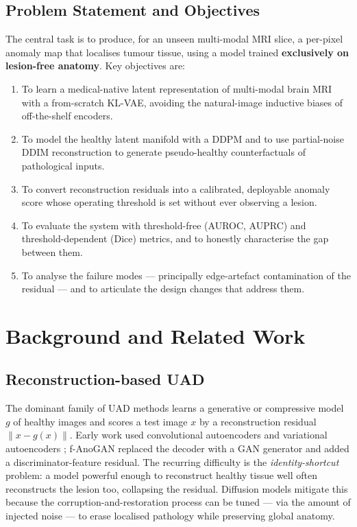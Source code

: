 \documentclass[12pt, a4paper]{article}
\begin{document}
\subsection{Problem Statement and Objectives}
The central task is to produce, for an unseen multi-modal MRI slice, a per-pixel anomaly map that localises tumour tissue, using a model trained \textbf{exclusively on lesion-free anatomy}. Key objectives are:
\begin{enumerate}[label=\alph*)]
    \item To learn a medical-native latent representation of multi-modal brain MRI with a from-scratch KL-VAE, avoiding the natural-image inductive biases of off-the-shelf encoders.
    \item To model the healthy latent manifold with a DDPM and to use partial-noise DDIM reconstruction to generate pseudo-healthy counterfactuals of pathological inputs.
    \item To convert reconstruction residuals into a calibrated, deployable anomaly score whose operating threshold is set without ever observing a lesion.
    \item To evaluate the system with threshold-free (AUROC, AUPRC) and threshold-dependent (Dice) metrics, and to honestly characterise the gap between them.
    \item To analyse the failure modes — principally edge-artefact contamination of the residual — and to articulate the design changes that address them.
\end{enumerate}

\section{Background and Related Work}
\subsection{Reconstruction-based UAD}
The dominant family of UAD methods learns a generative or compressive model $g$ of healthy images and scores a test image $x$ by a reconstruction residual $\|x - g(x)\|$. Early work used convolutional autoencoders and variational autoencoders \cite{baur2021}; f-AnoGAN \cite{schlegl2019} replaced the decoder with a GAN generator and added a discriminator-feature residual. The recurring difficulty is the \emph{identity-shortcut} problem: a model powerful enough to reconstruct healthy tissue well often reconstructs the lesion too, collapsing the residual. Diffusion models mitigate this because the corruption-and-restoration process can be tuned — via the amount of injected noise — to erase localised pathology while preserving global anatomy.
\end{document}
